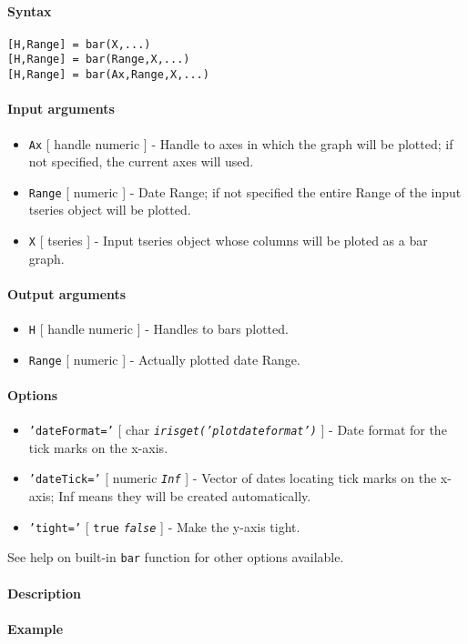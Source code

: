 


	\paragraph{Syntax}

\begin{verbatim}
[H,Range] = bar(X,...)
[H,Range] = bar(Range,X,...)
[H,Range] = bar(Ax,Range,X,...)
\end{verbatim}

\paragraph{Input arguments}

\begin{itemize}
\item
  \texttt{Ax} {[} handle \textbar{} numeric {]} - Handle to axes in
  which the graph will be plotted; if not specified, the current axes
  will used.
\item
  \texttt{Range} {[} numeric {]} - Date Range; if not specified the
  entire Range of the input tseries object will be plotted.
\item
  \texttt{X} {[} tseries {]} - Input tseries object whose columns will
  be ploted as a bar graph.
\end{itemize}

\paragraph{Output arguments}

\begin{itemize}
\item
  \texttt{H} {[} handle \textbar{} numeric {]} - Handles to bars
  plotted.
\item
  \texttt{Range} {[} numeric {]} - Actually plotted date Range.
\end{itemize}

\paragraph{Options}

\begin{itemize}
\item
  \texttt{'dateFormat='} {[} char \textbar{}
  \emph{\texttt{irisget('plotdateformat')}} {]} - Date format for the
  tick marks on the x-axis.
\item
  \texttt{'dateTick='} {[} numeric \textbar{} \emph{\texttt{Inf}} {]} -
  Vector of dates locating tick marks on the x-axis; Inf means they will
  be created automatically.
\item
  \texttt{'tight='} {[} \texttt{true} \textbar{} \emph{\texttt{false}}
  {]} - Make the y-axis tight.
\end{itemize}

See help on built-in \texttt{bar} function for other options available.

\paragraph{Description}

\paragraph{Example}


